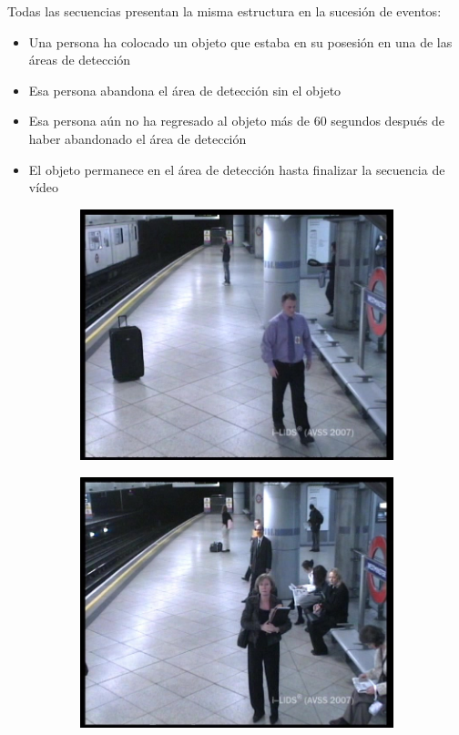 Todas las secuencias presentan la misma estructura en la sucesión de eventos:

\begin{itemize}
    \item Una persona ha colocado un objeto que estaba en su posesión en una de las áreas de detección
    \item Esa persona abandona el área de detección sin el objeto
    \item Esa persona aún no ha regresado al objeto más de 60 segundos después de haber abandonado el área de detección
    \item El objeto permanece en el área de detección hasta finalizar la secuencia de vídeo
\end{itemize}

\begin{figure}[ht]
  \centering
  \begin{subfigure}[b]{0.4\textwidth}
    \includegraphics[width=\textwidth]{img/chapters/resultados/datasets/AVSSAB_1.jpg}
    \caption{}
    \label{fig:avssab2007_1}
  \end{subfigure}
  \qquad\qquad
  \begin{subfigure}[b]{0.4\textwidth}
    \includegraphics[width=\textwidth]{img/chapters/resultados/datasets/AVSSAB_2.jpg}

\end{subfigure}
\end{figure}
